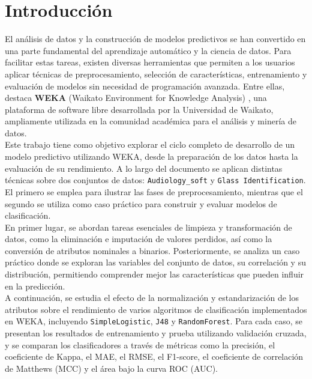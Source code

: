 \documentclass{article}
\begin{document}

\newpage

\tableofcontents
\listoftables


\newpage

\section{Introducción}

El análisis de datos y la construcción de modelos predictivos se han convertido en una parte fundamental del aprendizaje automático y la ciencia de datos. Para facilitar estas tareas, existen diversas herramientas que permiten a los usuarios aplicar técnicas de preprocesamiento, selección de características, entrenamiento y evaluación de modelos sin necesidad de programación avanzada. Entre ellas, destaca \textbf{WEKA} (Waikato Environment for Knowledge Analysis) \cite{weka2016}, una plataforma de software libre desarrollada por la Universidad de Waikato, ampliamente utilizada en la comunidad académica para el análisis y minería de datos.\\

Este trabajo tiene como objetivo explorar el ciclo completo de desarrollo de un modelo predictivo utilizando WEKA, desde la preparación de los datos hasta la evaluación de su rendimiento. A lo largo del documento se aplican distintas técnicas sobre dos conjuntos de datos: \texttt{Audiology\_soft} y \texttt{Glass Identification}. El primero se emplea para ilustrar las fases de preprocesamiento, mientras que el segundo se utiliza como caso práctico para construir y evaluar modelos de clasificación. \\

En primer lugar, se abordan tareas esenciales de limpieza y transformación de datos, como la eliminación e imputación de valores perdidos, así como la conversión de atributos nominales a binarios. Posteriormente, se analiza un caso práctico donde se exploran las variables del conjunto de datos, su correlación y su distribución, permitiendo comprender mejor las características que pueden influir en la predicción.\\

A continuación, se estudia el efecto de la normalización y estandarización de los atributos sobre el rendimiento de varios algoritmos de clasificación implementados en WEKA, incluyendo \texttt{SimpleLogistic}, \texttt{J48} y \texttt{RandomForest}. Para cada caso, se presentan los resultados de entrenamiento y prueba utilizando validación cruzada, y se comparan los clasificadores a través de métricas como la precisión, el coeficiente de Kappa, el MAE, el RMSE, el F1-score, el coeficiente de correlación de Matthews (MCC) y el área bajo la curva ROC (AUC).\\
\end{document}
